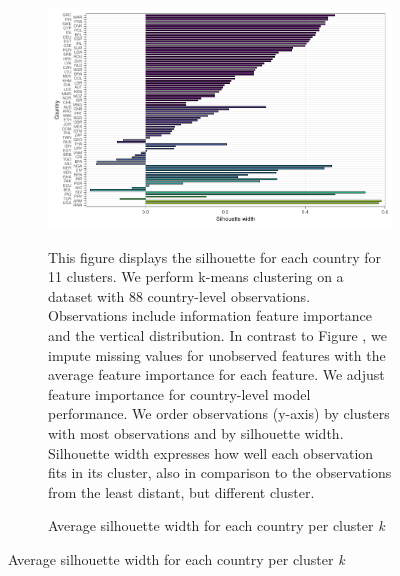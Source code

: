  \begin{figure}[ht!]\ContinuedFloat
   \centering
   \begin{subfigure}[b]{\textwidth}
   \centering
   \includegraphics{Figures_Appendix/Figure_Silhouette_Clusters_3.pdf}
   \caption{Average silhouette width for each country per cluster \textit{k}} \label{fig:G2_silhouette_3}
   \begin{subcaption2}
     This figure displays the silhouette for each country for 11 clusters. We perform k-means clustering on a dataset with 88 country-level observations. Observations include information feature importance and the vertical distribution. In contrast to Figure , we impute missing values for unobserved features with the average feature importance for each feature. We adjust feature importance for country-level model performance.  We order observations (y-axis) by clusters with most observations and by silhouette width. Silhouette width expresses how well each observation fits in its cluster, also in comparison to the observations from the least distant, but different cluster.
   \end{subcaption2}
   \end{subfigure}
 \end{figure}
 \clearpage